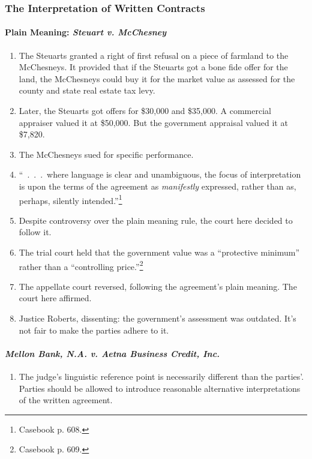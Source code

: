 \subsubsection{The Interpretation of Written Contracts}

\paragraph{Plain Meaning: \emph{Steuart v. McChesney}}

\begin{enumerate}
    \item The Steuarts granted a right of first refusal on a piece of farmland 
    to the McChesneys. It provided that if the Steuarts got a bone fide offer 
    for the land, the McChesneys could buy it for the market value as assessed 
    for the county and state real estate tax levy.
    \item Later, the Steuarts got offers for \$30,000 and \$35,000. A 
    commercial appraiser valued it at \$50,000. But the government appraisal 
    valued it at \$7,820.
    \item The McChesneys sued for specific performance.
    \item ``~.~.~.~where language is clear and unambiguous, the focus of 
    interpretation is upon the terms of the agreement as \emph{manifestly} 
    expressed, rather than as, perhaps, silently intended.''\footnote{Casebook 
    p. 608.}
    \item Despite controversy over the plain meaning rule, the court here 
    decided to follow it.
    \item The trial court held that the government value was a ``protective 
    minimum'' rather than a ``controlling price.''\footnote{Casebook p. 609.}
    \item The appellate court reversed, following the agreement's plain 
    meaning. The court here affirmed.
    \item Justice Roberts, dissenting: the government's assessment was 
    outdated. It's not fair to make the parties adhere to it.
\end{enumerate}

\paragraph{\emph{Mellon Bank, N.A. v. Aetna Business Credit, Inc.}}

\begin{enumerate}
    \item The judge's linguistic reference point is necessarily different 
    than the parties'. Parties should be allowed to introduce reasonable 
    alternative interpretations of the written agreement.
\end{enumerate}


